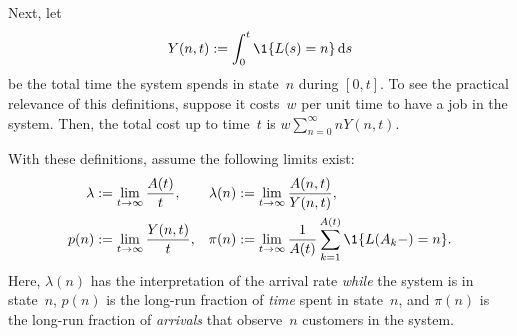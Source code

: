 \documentclass[stochastic-or.tex]{subfiles}
\begin{document}
Next, let
\begin{equation*}
 Y(n,t) := \int_0^t \1{\L(s) = n} \d s
\end{equation*}
be the total time the system spends in state~$n$ during $[0,t]$.
To see the practical relevance of this definitions, suppose it costs~$w$ per unit time to have a job in the system.
Then, the total cost up to time~$t$ is $w \sum_{n=0}^\infty n Y(n,t)$. %

With these definitions, assume the following limits exist:
\begin{subequations}
\label{eq:18}
\begin{align}
\lambda &:= \lim_{t\to\infty} \frac{A(t)}{t}, & \lambda(n) &:= \lim_{t\to\infty} \frac{A(n,t)}{Y(n,t)}, \\
p(n) &:=\lim_{t\to\infty} \frac{Y(n,t)}{t},  & \pi(n) &:= \lim_{t\to\infty}\frac1{A(t)}\sum_{k=1}^{A(t)} \1{\L(A_k-) = n}.
\end{align}
\end{subequations}
Here, $\lambda(n)$ has the interpretation of the arrival rate \emph{while} the system is in state~$n$, $p(n)$ is the long-run fraction of \emph{time} spent in state~$n$, and $\pi(n)$ is the long-run fraction of \emph{arrivals} that observe~$n$ customers in the system.
\end{document}
